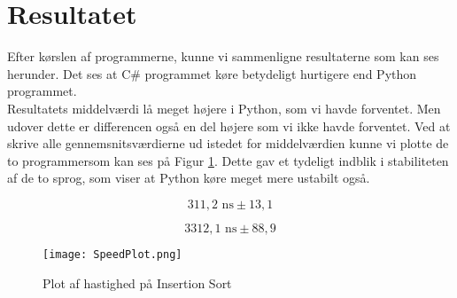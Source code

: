 \documentclass[class=report, crop=false]{standalone}
\begin{document}
    \section{Resultatet}
    Efter kørslen af programmerne, kunne vi sammenligne resultaterne som kan ses herunder. Det ses at C\# programmet køre betydeligt hurtigere end Python programmet.\\
    Resultatets middelværdi lå meget højere i Python, som vi havde forventet. Men udover dette er differencen også en del højere som vi ikke havde forventet. Ved at skrive alle gennemsnitsværdierne ud istedet for middelværdien kunne vi plotte de to programmersom kan ses på Figur \ref{fig:SpeedPlot}. Dette gav et tydeligt indblik i stabiliteten af de to sprog, som viser at Python køre meget mere ustabilt også. 
    
    \begin{tcolorbox}
         \[ 311,2 \text{ ns} \pm 13,1  \]
    \end{tcolorbox}
    \begin{tcolorbox}
         \[ 3312,1 \text{ ns} \pm 88,9  \]
    \end{tcolorbox}

    \begin{tcolorbox}
        \begin{figure}[H]
            \centering
            \texttt{[image: SpeedPlot.png]}
            \caption{Plot af hastighed på Insertion Sort}
            \label{fig:SpeedPlot}
        \end{figure}
    \end{tcolorbox}
\end{document}
